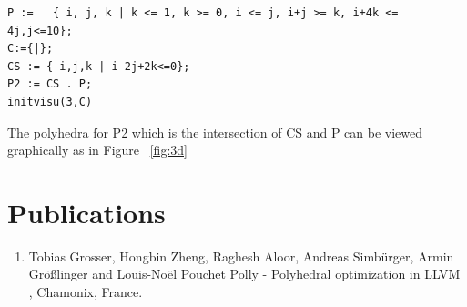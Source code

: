 \documentclass[MTech]{iitmdiss}
\begin{document}
{\footnotesize
\begin{lstlisting}
P :=   { i, j, k | k <= 1, k >= 0, i <= j, i+j >= k, i+4k <= 4j,j<=10};
C:={|};
CS := { i,j,k | i-2j+2k<=0};
P2 := CS . P;
initvisu(3,C)
\end{lstlisting}
}
The polyhedra for P2 which is the intersection of CS and P can be viewed graphically as in 
Figure ~\ref{fig:3d}




\chapter*{Publications}
\vspace{-0.3cm}

\begin{enumerate}
\item Tobias Grosser, Hongbin Zheng, Raghesh Aloor, Andreas Simb{\"u}rger, Armin {G}r{\"o}{\ss}linger and Louis-No{\"e}l Pouchet \newblock
  Polly - Polyhedral optimization in LLVM , Chamonix, France.
\end{enumerate}


\pagebreak
\begin{singlespace}
  \begin{small}
	
%
  \end{small}
\end{singlespace}

\end{document}
